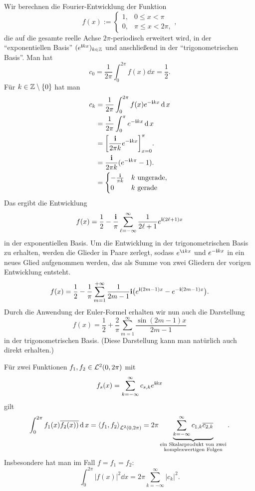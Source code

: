 \begin{bsp} 
	Wir berechnen die Fourier-Entwicklung der Funktion
	\[
		f(x) := \begin{cases} 1, & 0 \le x < \pi \\
		0, & \pi \le x < 2 \pi, \end{cases},
	\]
	die auf  die gesamte reelle Achse $2\pi$-periodisch erweitert wird, in der ``exponentiellen Basis'' $(e^{\mathbf{i} k x})_{k \in \mathbb{Z}}$ und anschließend in der ``trigonometrischen Basis''. Man hat 
	\[
		c_0 = \frac{1}{2 \pi} \int_0^{2 \pi} f(x) \dd x = \frac{1}{2}. 
	\]
	Für $k \in \mathbb{Z} \setminus \{0\}$ hat man 
	\begin{align*}
		c_k & = \frac{1}{2 \pi} \int_0^{2 \pi }	f(x) e^{-\iu k x} \dd x
		\\ & = \frac{1}{2 \pi} \int_0^{\pi} e^{-\iu k x} \dd x 
		\\ & = \biggl[ \frac{\iu}{2 \pi k}  e^{-\iu k x} \biggr]_{x=0}^{\pi}. 
		\\ & = \frac{\iu }{2\pi k} ( e^{-\iu k \pi } -1). 
		\\ & = \begin{cases} - \frac{\iu}{\pi k} & k \ \text{ungerade} , 
		\\ 0 & k \ \text{gerade} \end{cases} 
	\end{align*}
	Das ergibt die Entwicklung 
	\[
		f(x) = \frac{1}{2} - \frac{\mathbf{i}}{\pi} \sum_{\ell = - \infty}^\infty \frac{1}{2 \ell +1} e^{\mathbf{i} (2\ell+1) x}
	\]
	in der exponentiellen Basis. 
	Um die Entwicklung in der trigonometrischen Basis zu erhalten, werden die  Glieder in Paare zerlegt, sodass $e^{\i k x}$ und $e^{-\mathbf{i} k x}$ in ein neues Glied aufgenommen werden, das als Summe von zwei Gliedern der vorigen Entwicklung entsteht. 
	\[
		f(x) = \frac{1}{2} - \frac{1}{\pi} \sum_{m=1}^{+\infty} \frac{1}{2m -1} \mathbf{i} \bigl(e^{\mathbf{i} (2m-1) x} - e^{- \mathbf{i} (2m-1) x} \bigr). 
	\]
	Durch die Anwendung der Euler-Formel erhalten wir nun auch die Darstellung
	\[
		f(x) = \frac{1}{2}  +\frac{2}{\pi} \sum_{m=1}^\infty \frac{\sin (2m-1) x } {2m-1}
	\]
	in der trigonometrischen Basis. (Diese Darstellung kann man natürlich auch direkt erhalten.) 
\end{bsp} 

\begin{bem}[Pythagoras]
	Für zwei Funktionen $f_1, f_2 \in \mathcal{L}^2(0,2\pi)$ mit 
	\[
		f_s(x) = \sum_{k=-\infty}^\infty c_{s,k} e^{\mathbf{i} k x}
	\]
	gilt 
	\[
		\int_0^{2 \pi} f_1(x) \overline{f_2(x))} \operatorname{d} x = \left< f_1 , f_2 \right>_{\mathcal{L}^2(0,2 \pi)} = 2 \pi \underbrace{ \sum_{k=-\infty}^\infty c_{1,k} \overline{c_{2,k}} }_{\substack{\text{ein Skalarprodukt von zwei} \\ \text{komplexwertigen Folgen}}}. 
	\]
	Insbesondere hat man im Fall $f=f_1 =f_2$: 
	\[
		\int_0^{2 \pi} |f(x)|^2 \dd x = 2 \pi \sum_{k=-\infty}^\infty |c_k|^2.
	\]
\end{bem} 

